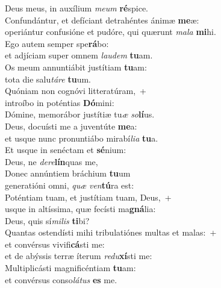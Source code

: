 \oddverse Deus meus, in auxílium \textit{me}\textit{um} \textbf{ré}spice.\\
\evenverse Confundántur, et defíciant detrahéntes ánimæ \textbf{me}æ:~\*\\
\evenverse operiántur confusióne et pudóre, qui quærunt \textit{ma}\textit{la} \textbf{mi}hi.\\
\oddverse Ego autem semper spe\textbf{rá}bo:~\*\\
\oddverse et adjíciam super omnem \textit{lau}\textit{dem} \textbf{tu}am.\\
\evenverse Os meum annuntiábit justítiam \textbf{tu}am:~\*\\
\evenverse tota die salu\textit{tá}\textit{re} \textbf{tu}um.\\
\oddverse Quóniam non cognóvi litteratúram,~+\\
\oddverse  introíbo in poténtias \textbf{Dó}mini:~\*\\
\oddverse Dómine, memorábor justítiæ tu\textit{æ} \textit{so}\textbf{lí}us.\\
\evenverse Deus, docuísti me a juventúte \textbf{me}a:~\*\\
\evenverse et usque nunc pronuntiábo mirabí\textit{li}\textit{a} \textbf{tu}a.\\
\oddverse Et usque in senéctam et \textbf{sé}nium:~\*\\
\oddverse Deus, ne \textit{de}\textit{re}\textbf{lín}quas me,\\
\evenverse Donec annúntiem bráchium \textbf{tu}um~\*\\
\evenverse generatióni omni, \textit{quæ} \textit{ven}\textbf{tú}ra est:\\
\oddverse Poténtiam tuam, et justítiam tuam, Deus,~+\\
\oddverse  usque in altíssima, quæ fecísti ma\textbf{gná}lia:~\*\\
\oddverse Deus, quis sí\textit{mi}\textit{lis} \textbf{ti}bi?\\
\evenverse Quantas ostendísti mihi tribulatiónes multas et malas:~+\\
\evenverse  et convérsus vivifi\textbf{cá}sti me:~\*\\
\evenverse et de abýssis terræ íterum \textit{re}\textit{du}\textbf{xí}sti me:\\
\oddverse Multiplicásti magnificéntiam \textbf{tu}am:~\*\\
\oddverse et convérsus conso\textit{lá}\textit{tus} \textbf{es} me.\\
